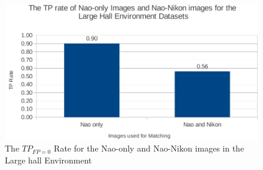 \documentclass[11pt]{report}
\begin{document}
\begin{figure}[h!] 
  \centering
    \includegraphics[width=1.0\textwidth]{../Drawings/Graphs/tp_rate_nikon_lh.pdf}
    \caption{The $TP_{FP=0}$ Rate for the Nao-only and Nao-Nikon images in the Large hall Environment}
    \label{fig:tp_rate_nikon_lh}
\end{figure}

\end{document}
